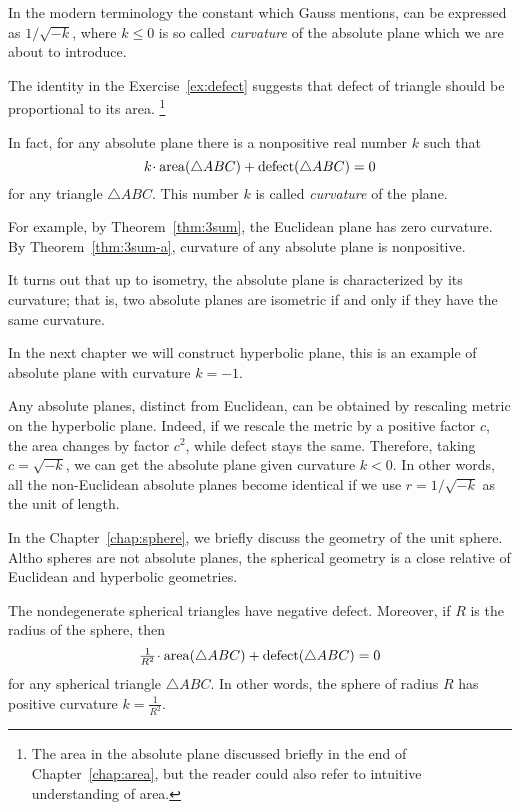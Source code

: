 In the modern terminology the constant which Gauss mentions, 
can be expressed as $1/\sqrt{-k}$, 
where $k\le 0$ is so called \emph{curvature} of the absolute plane which we are about to introduce.

The identity in the Exercise~\ref{ex:defect}
suggests that defect of triangle 
should be proportional to its area.%
\footnote{The area in the absolute plane discussed briefly in the end of Chapter~\ref{chap:area},
but the reader could also refer to intuitive understanding of area.}

In fact, for any absolute plane there is a nonpositive real number $k$
such that 
$$k\cdot\area(\triangle ABC)+\defect(\triangle ABC)=0$$
for any triangle $\triangle ABC$.
This number $k$ is called \emph{curvature} of the plane.

For example, by Theorem~\ref{thm:3sum}, the Euclidean plane has zero curvature.
By Theorem~\ref{thm:3sum-a}, curvature of any absolute plane is nonpositive.

It turns out that up to isometry, the absolute plane is characterized by its curvature;
that is, two absolute planes are isometric if and only if they have the same curvature. 



In the next chapter we will construct hyperbolic plane,
this is an example of absolute plane with curvature $k=-1$.

Any absolute planes, distinct from Euclidean,
can be obtained by rescaling metric on the hyperbolic plane.
Indeed,
if we rescale the metric by a positive factor $c$,
the area changes by factor $c^2$, 
while defect stays the same.
Therefore, taking $c=\sqrt{-k}$,
we can get the absolute plane given curvature $k<0$.
In other words, all the non-Euclidean absolute planes become identical
if we use $r=1/\sqrt{-k}$ as the unit of length.

\medskip

In the Chapter~\ref{chap:sphere},
we briefly discuss the geometry of the unit sphere.
Altho spheres are not absolute planes,
the spherical geometry is a close relative of Euclidean and hyperbolic geometries.

The nondegenerate spherical triangles have negative defect.
Moreover, 
if $R$ is the radius of the sphere, 
then 
$$\tfrac1{R^2}\cdot\area(\triangle ABC)+\defect(\triangle ABC)=0$$
for any spherical triangle $\triangle ABC$.
In other words, 
the sphere of radius $R$ has positive curvature $k=\tfrac1{R^2}$.


